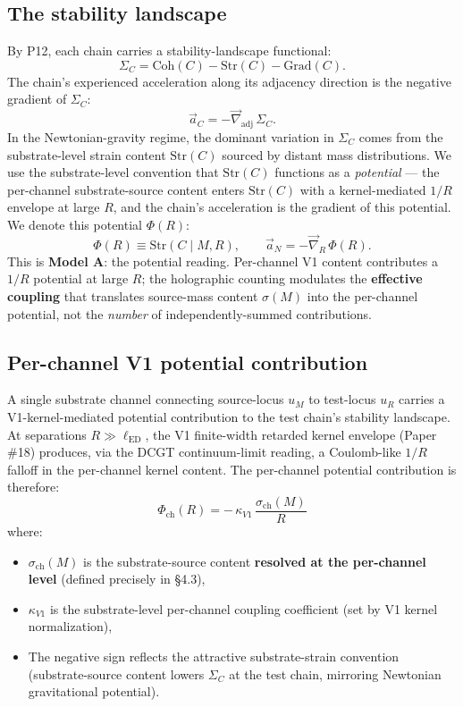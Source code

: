 \documentclass[11pt,a4paper]{article}
\begin{document}
\subsection{The stability landscape}

By P12, each chain carries a stability-landscape functional:
\[
\Sigma_C = \mathrm{Coh}(C) - \mathrm{Str}(C) - \mathrm{Grad}(C).
\]
The chain's experienced acceleration along its adjacency direction is the negative gradient of $\Sigma_C$:
\[
\vec{a}_C = -\vec{\nabla}_\mathrm{adj}\,\Sigma_C.
\]
In the Newtonian-gravity regime, the dominant variation in $\Sigma_C$ comes from the substrate-level strain content $\mathrm{Str}(C)$ sourced by distant mass distributions. We use the substrate-level convention that $\mathrm{Str}(C)$ functions as a \emph{potential} --- the per-channel substrate-source content enters $\mathrm{Str}(C)$ with a kernel-mediated $1/R$ envelope at large $R$, and the chain's acceleration is the gradient of this potential. We denote this potential $\Phi(R)$:
\[
\Phi(R) \equiv \mathrm{Str}(C \mid M, R), \qquad \vec{a}_N = -\vec{\nabla}_R\,\Phi(R).
\]
This is \textbf{Model A}: the potential reading. Per-channel V1 content contributes a $1/R$ potential at large $R$; the holographic counting modulates the \textbf{effective coupling} that translates source-mass content $\sigma(M)$ into the per-channel potential, not the \emph{number} of independently-summed contributions.

\subsection{Per-channel V1 potential contribution}

A single substrate channel connecting source-locus $u_M$ to test-locus $u_R$ carries a V1-kernel-mediated potential contribution to the test chain's stability landscape. At separations $R \gg \ell_\mathrm{ED}$, the V1 finite-width retarded kernel envelope (Paper \#18) produces, via the DCGT continuum-limit reading, a Coulomb-like $1/R$ falloff in the per-channel kernel content. The per-channel potential contribution is therefore:
\[
\Phi_\mathrm{ch}(R) = -\,\kappa_{V1}\,\frac{\sigma_\mathrm{ch}(M)}{R}
\]
where:

\begin{itemize}[noitemsep]
\item $\sigma_\mathrm{ch}(M)$ is the substrate-source content \textbf{resolved at the per-channel level} (defined precisely in \S4.3),
\item $\kappa_{V1}$ is the substrate-level per-channel coupling coefficient (set by V1 kernel normalization),
\item The negative sign reflects the attractive substrate-strain convention (substrate-source content lowers $\Sigma_C$ at the test chain, mirroring Newtonian gravitational potential).
\end{itemize}
\end{document}
